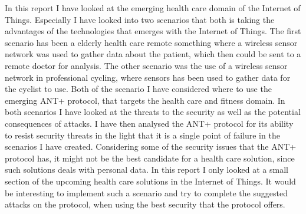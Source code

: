 In this report I have looked at the emerging health care domain of the Internet of Things. Especially I have looked into two scenarios that both is taking the advantages of the technologies that emerges with the Internet of Things. The first scenario has been a elderly health care remote something where a wireless sensor network was used to gather data about the patient, which then could be sent to a remote doctor for analysis. The other scenario was the use of a wireless sensor network in professional cycling, where sensors has been used to gather data for the cyclist to use. Both of the scenario I have considered where to use the emerging ANT+ protocol, that targets the health care and fitness domain. In both scenarios I have looked at the threats to the security as well as the potential consequences of attacks. I have then analysed the ANT+ protocol for its ability to resist security threats in the light that it is a single point of failure in the scenarios I have created. Considering some of the security issues that the ANT+ protocol has, it might not be the best candidate for a health care solution, since such solutions deals with personal data. In this report I only looked at a small section of the upcoming health care solutions in the Internet of Things. It would be interesting to implement such a scenario and try to complete the suggested attacks on the protocol, when using the best security that the protocol offers.